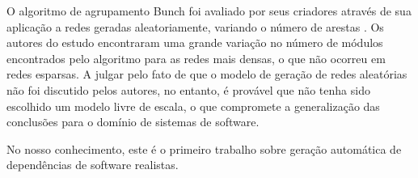 O algoritmo de agrupamento Bunch foi avaliado por seus criadores através de sua aplicação a redes geradas aleatoriamente, variando o número de arestas \cite{Mitchell2007}. Os autores do estudo encontraram uma grande variação no número de módulos encontrados pelo algoritmo para as redes mais densas, o que não ocorreu em redes esparsas. A julgar pelo fato de que o modelo de geração de redes aleatórias não foi discutido pelos autores, no entanto, é provável que não tenha sido escolhido um modelo livre de escala, o que compromete a generalização das conclusões para o domínio de sistemas de software. 

No nosso conhecimento, este é o primeiro trabalho sobre geração automática de dependências de software realistas.


